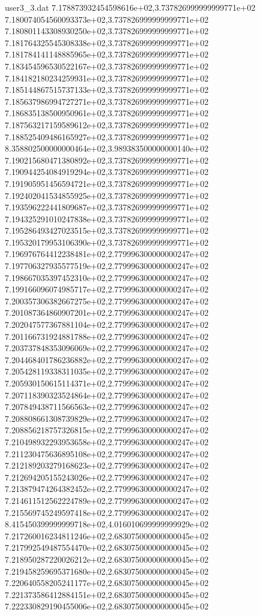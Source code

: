 \begin{filecontents}{user3_3.dat}
7.178873932454598616e+02,3.737826999999999771e+02
7.180074054560093373e+02,3.737826999999999771e+02
7.180801143308930250e+02,3.737826999999999771e+02
7.181764325545308338e+02,3.737826999999999771e+02
7.181784141148885965e+02,3.737826999999999771e+02
7.183454596530522167e+02,3.737826999999999771e+02
7.184182180234259931e+02,3.737826999999999771e+02
7.185144867515737133e+02,3.737826999999999771e+02
7.185637986994727271e+02,3.737826999999999771e+02
7.186835138500950961e+02,3.737826999999999771e+02
7.187563217159589612e+02,3.737826999999999771e+02
7.188525409486165927e+02,3.737826999999999771e+02
8.358802500000000464e+02,3.989383500000000140e+02
7.190215680471380892e+02,3.737826999999999771e+02
7.190944254084919294e+02,3.737826999999999771e+02
7.191905951456594721e+02,3.737826999999999771e+02
7.192402041534855925e+02,3.737826999999999771e+02
7.193596222441809687e+02,3.737826999999999771e+02
7.194325291010247838e+02,3.737826999999999771e+02
7.195286493427023515e+02,3.737826999999999771e+02
7.195320179953106390e+02,3.737826999999999771e+02
7.196976764412238481e+02,2.779996300000000247e+02
7.197706327935577519e+02,2.779996300000000247e+02
7.198667035397452310e+02,2.779996300000000247e+02
7.199166096074985717e+02,2.779996300000000247e+02
7.200357306382667275e+02,2.779996300000000247e+02
7.201087364860907201e+02,2.779996300000000247e+02
7.202047577367881104e+02,2.779996300000000247e+02
7.201166731924881788e+02,2.779996300000000247e+02
7.203737848353096069e+02,2.779996300000000247e+02
7.204468401786236882e+02,2.779996300000000247e+02
7.205428119338311035e+02,2.779996300000000247e+02
7.205930150615114371e+02,2.779996300000000247e+02
7.207118390323524864e+02,2.779996300000000247e+02
7.207849438711566563e+02,2.779996300000000247e+02
7.208808661308739829e+02,2.779996300000000247e+02
7.208856218757326815e+02,2.779996300000000247e+02
7.210498932293953658e+02,2.779996300000000247e+02
7.211230475636895108e+02,2.779996300000000247e+02
7.212189203279168623e+02,2.779996300000000247e+02
7.212694205155243026e+02,2.779996300000000247e+02
7.213879474264382452e+02,2.779996300000000247e+02
7.214611512562224789e+02,2.779996300000000247e+02
7.215569745249597418e+02,2.779996300000000247e+02
8.415450399999999718e+02,4.016010699999999929e+02
7.217260016234811246e+02,2.683075000000000045e+02
7.217992549487554470e+02,2.683075000000000045e+02
7.218950287220026212e+02,2.683075000000000045e+02
7.219458259695371680e+02,2.683075000000000045e+02
7.220640558205241177e+02,2.683075000000000045e+02
7.221373586412884151e+02,2.683075000000000045e+02
7.222330829190455006e+02,2.683075000000000045e+02

\end{filecontents}
